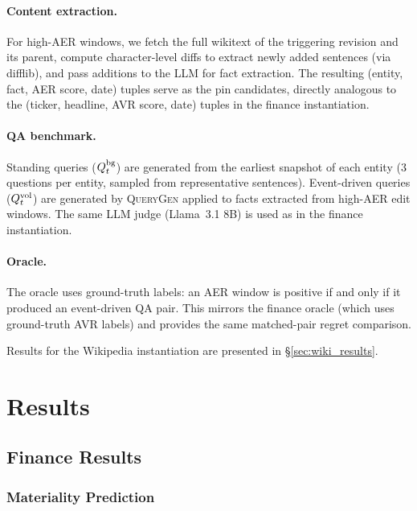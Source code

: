 \documentclass{article}
\begin{document}
\paragraph{Content extraction.}
For high-AER windows, we fetch the full wikitext of the triggering revision and its parent, compute character-level diffs to extract newly added sentences (via difflib), and pass additions to the LLM for fact extraction.
The resulting (entity, fact, AER score, date) tuples serve as the pin candidates, directly analogous to the (ticker, headline, AVR score, date) tuples in the finance instantiation.

\paragraph{QA benchmark.}
Standing queries ($Q_t^{\textup{bg}}$) are generated from the earliest snapshot of each entity (3 questions per entity, sampled from representative sentences).
Event-driven queries ($Q_t^{\textup{vol}}$) are generated by \textsc{QueryGen} applied to facts extracted from high-AER edit windows.
The same LLM judge (Llama~3.1 8B) is used as in the finance instantiation.

\paragraph{Oracle.}
The oracle uses ground-truth labels: an AER window is positive if and only if it produced an event-driven QA pair.
This mirrors the finance oracle (which uses ground-truth AVR labels) and provides the same matched-pair regret comparison.

Results for the Wikipedia instantiation are presented in \S\ref{sec:wiki_results}.

\section{Results}
\label{sec:results}

\subsection{Finance Results}
\label{sec:finance_results}

\subsubsection{Materiality Prediction}
\end{document}
